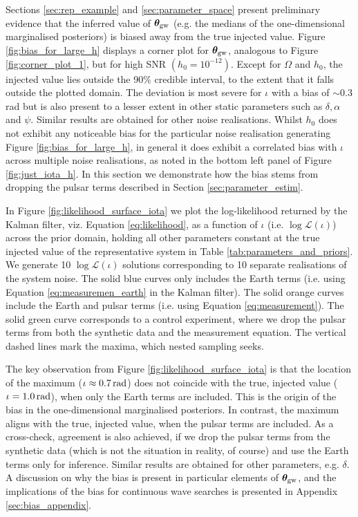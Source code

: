 \documentclass[fleqn,usenatbib,useAMS]{mnras}
\begin{document}
Sections \ref{sec:rep_example} and \ref{sec:parameter_space} present preliminary evidence that the inferred value of ${\boldsymbol{\theta}}_{\rm gw}$ (e.g. the medians of the one-dimensional marginalised posteriors) is biased away from the true injected value. Figure \ref{fig:bias_for_large_h} displays a corner plot for $\boldsymbol{\theta}_{\rm gw}$, analogous to Figure \ref{fig:corner_plot_1}, but for high SNR $(h_0 = 10^{-12})$. Except for $\Omega$ and $h_0$, the injected value lies outside the 90\% credible interval, to the extent that it falls outside the plotted domain. The deviation is most severe for $\iota$ with a bias of $\sim 0.3$ rad but is also present to a lesser extent in other static parameters such as $\delta,\alpha$ and $\psi$. Similar results are obtained for other noise realisations. Whilst $h_0$ does not exhibit any noticeable bias for the particular noise realisation generating Figure \ref{fig:bias_for_large_h}, in general it does exhibit a correlated bias with $\iota$ across multiple noise realisations, as noted in the bottom left panel of Figure \ref{fig:just_iota_h}. In this section we demonstrate how the bias stems from dropping the pulsar terms described in Section \ref{sec:parameter_estim}. \newline 


In Figure \ref{fig:likelihood_surface_iota} we plot the log-likelihood returned by the Kalman filter, viz. Equation \eqref{eq:likelihood}, as a function of $\iota$ (i.e. $\log \mathcal{L}(\iota)$) across the prior domain, holding all other parameters constant at the true injected value of the representative system in Table \ref{tab:parameters_and_priors}. We generate 10 $\log \mathcal{L}(\iota)$ solutions corresponding to 10 separate realisations of the system noise. The solid blue curves only includes the Earth terms (i.e. using Equation \eqref{eq:measuremen_earth} in the Kalman filter). The solid orange curves include the Earth and pulsar terms (i.e. using Equation \eqref{eq:measurement}). The solid green curve corresponds to a control experiment, where we drop the pulsar terms from both the synthetic data and the measurement equation. The vertical dashed lines mark the maxima, which nested sampling seeks. \newline  


The key observation from Figure \ref{fig:likelihood_surface_iota} is that the location of the maximum ($\iota \approx 0.7 \, {\rm rad}$) does not coincide with the true, injected value ($\iota = 1.0 \, {\rm rad}$), when only the Earth terms are included. This is the origin of the bias in the one-dimensional marginalised posteriors. In contrast, the maximum aligns with the true, injected value, when the pulsar terms are included. As a cross-check, agreement is also achieved, if we drop the pulsar terms from the synthetic data (which is not the situation in reality, of course) and use the Earth terms only for inference. Similar results are obtained for other parameters, e.g. $\delta$. A discussion on why the bias is present in particular elements of $\boldsymbol{\theta}_{\rm gw}$, and the implications of the bias for continuous wave searches is presented in Appendix \ref{sec:bias_appendix}. \newline 
\end{document}
